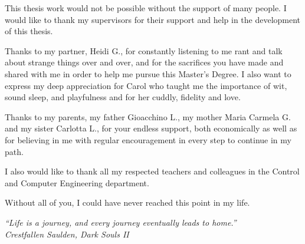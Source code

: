
This thesis work would not be possible without the support of many people. I would like to thank my supervisors for their support and help in the development of this thesis.\bigskip

Thanks to my partner, Heidi G., for constantly listening to me rant and talk about strange things over and over, and for the sacrifices you have made and shared with me in order to help me pursue this Master's Degree. I also want to express my deep appreciation for Carol who taught me the importance of wit, sound sleep, and playfulness and for her cuddly, fidelity and love.\bigskip

Thanks to my parents, my father Gioacchino L., my mother Maria Carmela G. and my sister Carlotta L., for your endless support, both economically as well as for believing in me with regular encouragement in every step to continue in my path.\bigskip

I also would like to thank all my respected teachers and colleagues in the Control and Computer Engineering department. \bigskip

Without all of you, I could have never reached this point in my life.


\vspace*{5\baselineskip}

\begin{flushright}
    \textit{``Life is a journey, and every journey eventually leads to home.''\\
    Crestfallen Saulden, Dark Souls II}
\end{flushright}
